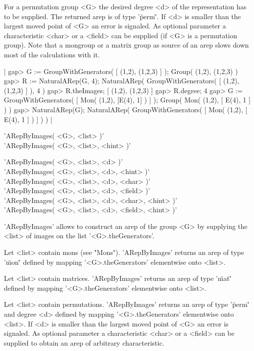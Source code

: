 For a permutation group <G> the desired degree <d> of the 
representation has to be supplied. The returned arep is of 
type '\"perm\"'. If <d> is smaller than the 
largest moved point of <G> an error is signaled. 
As optional parameter a characteristic <char> or a <field> 
can be supplied (if <G> is a permutation group).
Note that a mongroup or a matrix group as source of an arep
slows down most of the calculations with it.

|    gap> G := GroupWithGenerators( [ (1,2), (1,2,3) ] );
    Group( (1,2), (1,2,3) )
    gap> R := NaturalARep(G, 4);
    NaturalARep( GroupWithGenerators( [ (1,2), (1,2,3) ] ), 4 )
    gap> R.theImages;
    [ (1,2), (1,2,3) ]
    gap> R.degree;
    4
    gap> G := GroupWithGenerators( [ Mon( (1,2), [E(4), 1] ) ] );
    Group( Mon(
      (1,2),
      [ E(4), 1 ]
    ) )
    gap> NaturalARep(G);
    NaturalARep( 
      GroupWithGenerators( [ Mon(
          (1,2),
          [ E(4), 1 ]
        ) ] ) ) |


'ARepByImages( <G>, <list> )'\\
'ARepByImages( <G>, <list>, <hint> )'

\medskip
'ARepByImages( <G>, <list>, <d> )'\\
'ARepByImages( <G>, <list>, <d>, <hint> )'\\
'ARepByImages( <G>, <list>, <d>, <char> )'\\
'ARepByImages( <G>, <list>, <d>, <field> )'\\
'ARepByImages( <G>, <list>, <d>, <char>, <hint> )'\\
'ARepByImages( <G>, <list>, <d>, <field>, <hint> )'

'ARepByImages' allows to construct an arep of the group <G> 
by supplying the <list> of images on the list '<G>.theGenerators'.

Let <list> contain mons (see "Mons"). 'ARepByImages' returns an arep 
of type '\"mon\"' defined by mapping '<G>.theGenerators' 
elementwise onto <list>.

Let <list> contain matrices. 'ARepByImages' returns an arep 
of type '\"mat\"' defined by mapping '<G>.theGenerators' 
elementwise onto <list>.

Let <list> contain permutations. 'ARepByImages' returns an arep 
of type '\"perm\"' and degree <d> defined by mapping '<G>.theGenerators' 
elementwise onto <list>. If <d> is smaller than the 
largest moved point of <G> an error is signaled.
As optional parameter a characteristic 
<char> or a <field> can be supplied to obtain an arep of arbitrary
characteristic.

